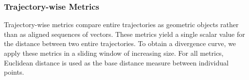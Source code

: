\documentclass[a4paper,12pt]{article}
\begin{document}
\subsubsection{Trajectory-wise Metrics}
\label{sssec:methods_trajectory_metrics}
Trajectory-wise metrics compare entire trajectories as geometric objects rather than as aligned sequences of vectors. These metrics yield a single scalar value for the distance between two entire trajectories. To obtain a divergence curve, we apply these metrics in a sliding window of increasing size. For all metrics, Euclidean distance is used as the base distance measure between individual points.
\end{document}
